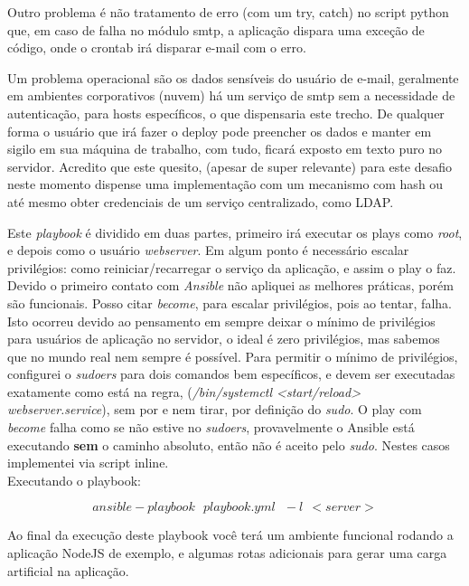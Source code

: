 Outro problema é não tratamento de erro (com um try, catch) no script
python que, em caso de falha no módulo smtp, a aplicação dispara uma
exceção de código, onde o crontab irá disparar e-mail com o erro.

Um problema operacional são os dados sensíveis do usuário de e-mail,
geralmente em ambientes corporativos (nuvem) há um serviço de smtp
sem a necessidade de autenticação, para hosts específicos, o que
dispensaria este trecho. De qualquer forma o usuário que irá fazer o
deploy pode preencher os dados e manter em sigilo em sua máquina de
trabalho, com tudo, ficará exposto em texto puro no servidor. Acredito
que este quesito, (apesar de super relevante) para este desafio neste
momento dispense uma implementação com um mecanismo com hash ou até
mesmo obter credenciais de um serviço centralizado, como LDAP.

Este \emph{playbook} é dividido em duas partes, primeiro irá executar
os plays como \emph{root}, e depois como o usuário \emph{webserver}.
Em algum ponto é necessário escalar privilégios: como
reiniciar/recarregar o serviço da aplicação, e assim o play
o faz. Devido o primeiro contato com \emph{Ansible} não apliquei as
melhores práticas, porém são funcionais. Posso citar \emph{become}, para
escalar privilégios, pois ao tentar, falha. Isto ocorreu devido ao
pensamento em sempre deixar o mínimo de privilégios para usuários de
aplicação no servidor, o ideal é zero privilégios, mas sabemos que no
mundo real nem sempre é possível. Para permitir o mínimo de
privilégios, configurei o \emph{sudoers} para dois comandos bem
específicos, e devem ser executadas exatamente como está na regra,
(\emph{/bin/systemctl <start/reload> webserver.service}), sem por e nem
tirar, por definição do \emph{sudo}. O play com \emph{become} falha
como se não estive no \emph{sudoers}, provavelmente o Ansible está
executando \textbf{sem} o caminho absoluto, então não é aceito pelo
\emph{sudo}. Nestes casos implementei via script inline.\\

Executando o playbook:

$$ansible-playbook\ \ \ playbook.yml\ \ \ -l\ \ <server>$$

Ao final da execução deste playbook você terá um ambiente funcional
rodando a aplicação NodeJS de exemplo, e algumas rotas adicionais para
gerar uma carga artificial na aplicação.\\

